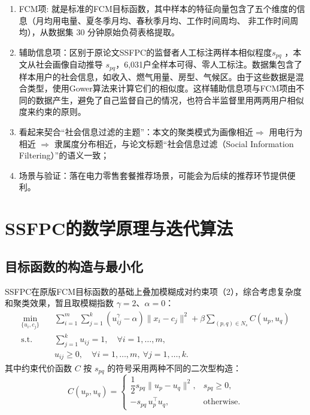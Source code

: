\documentclass[11pt,a4paper]{ctexart}
\begin{document}
	\begin{enumerate}[label=(\arabic*)]
		\item FCM项: 就是标准的FCM目标函数，其中样本的特征向量包含了五个维度的信息（月均用电量、夏冬季月均、春秋季月均、工作时间周均、 非工作时间周均），从数据集 30 分钟原始负荷表格提取。
		\item 辅助信息项：区别于原论文SSFPC的监督者人工标注两样本相似程度$s_{pq}$ ，本文从社会画像自动推导 $s_{pq}$，6,031户全样本可得、零人工标注。数据集包含了样本用户的社会信息，如收入、燃气用量、房型、气候区。由于这些数据是混合类型，使用Gower算法来计算它们的相似度。这样辅助信息项与FCM项由不同的数据产生，避免了自己监督自己的情况，也符合半监督里用两两用户相似度来约束的原则。
		\item 看起来契合“社会信息过滤的主题”：本文的聚类模式为画像相近$\Rightarrow$ 用电行为相近 $\Rightarrow$ 隶属度分布相近，与论文标题“社会信息过滤（Social Information Filtering）”的语义一致；
		\item 场景与验证：落在电力零售套餐推荐场景，可能会为后续的推荐环节提供便利。
	\end{enumerate}
	
	\section{SSFPC的数学原理与迭代算法}
	
	\subsection{目标函数的构造与最小化}
	
	SSFPC在原版FCM目标函数的基础上叠加模糊成对约束项（2），综合考虑复杂度和聚类效果，暂且取模糊指数 $\gamma=2$、$\alpha=0$：
	\begin{align}
		\min_{\{u_i,c_j\}} \quad & \sum_{i=1}^{m}\sum_{j=1}^{k} \left(u_{ij}^{\gamma} - \alpha\right)\|x_i - c_j\|^{2}
		+ \beta \sum_{(p,q)\in N_s} C(u_p,u_q) \\
		\text{s.t.} \quad & \sum_{j=1}^{k} u_{ij} = 1, \quad \forall i=1,\ldots,m, \\
		& u_{ij} \ge 0, \quad \forall i=1,\ldots,m,\ \forall j=1,\ldots,k.
	\end{align}
	其中约束代价函数 $C$ 按 $s_{pq}$ 的符号采用两种不同的二次型构造：
	\begin{equation}
		C(u_p,u_q) =
		\begin{cases}
			\dfrac{1}{2}s_{pq}\|u_p - u_q\|^{2}, & s_{pq} \ge 0,\\[6pt]
			-s_{pq}\,u_p^{\top}u_q, & \text{otherwise}.
		\end{cases}
	\end{equation}
	
\end{document}
